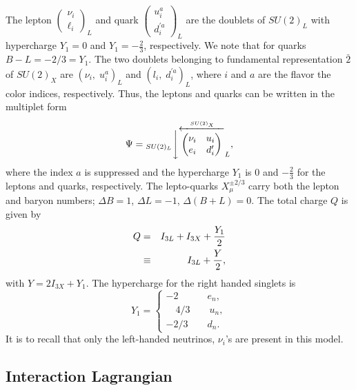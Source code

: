 \documentclass{ws-ijmpa}
\begin{document}
The lepton $\left(\begin{array}{c} \nu_i \\ \ell_i\end{array}\right)_L$ and quark $\left(\begin{array}{c} u^{a}_i \\ d^{\prime a}_i\end{array}\right)_L$ are the doublets of  $SU(2)_L$ with hypercharge $Y_{1}=0$ and  $Y_{1}=-\frac{2}{3}$, respectively. We note that for quarks $B-L = -2/3 = Y_{1}$. The two doublets belonging to fundamental representation $\bar{2}$ of $SU(2)_X$ are $(\nu_{i},\; u^{a}_{i})_{L}$ and $(l_i,\; d^{\prime a}_{i})_{L}$, where $i$ and $a$ are the flavor the color indices, respectively. Thus, the leptons and quarks can be written in the multiplet form 
\begin{equation}
\Psi =
{
_{SU(2)_L}{\Bigg\downarrow}{}
\overset{\xleftarrow{~~SU(2)_X~~}}{\begin{pmatrix}
 \nu_i &  u_i  \\
e_i & d^{\prime}_i
\end{pmatrix}}_{L}
},
\label{matrix-sec1}
\end{equation}
where the index $a$ is suppressed and the hypercharge $Y_{1}$ is $0$ and $-\frac{2}{3}$ for the leptons and quarks, respectively. The
lepto-quarks  $X_{\mu}^{\pm 2/3}$ carry both the lepton and baryon numbers; $\Delta B = 1$, $\Delta L = -1$,  $\Delta (B+L) = 0$. The total charge $Q$ is given by
\begin{eqnarray}
Q &=& I_{3L}+I_{3X}+\frac{Y_1}{2}\notag \\
&\equiv &  I_{3L} + \frac{Y}{2},
\end{eqnarray}
with $Y = 2 I_{3X}+Y_{1}$. The hypercharge for the right handed singlets is 
\begin{equation}
Y_1 = \left \{\begin{array}{c}-2 \quad\quad\quad e_{n}, \\\quad 4/3 \quad\quad u_{n}, \\-2/3 \quad\quad d_{n}. \end{array} \right. \label{Y1values}
\end{equation}
It is to recall that only the left-handed neutrinos, $\nu_{i}$'s are present in this model.


\subsection{Interaction Lagrangian}
\end{document}
